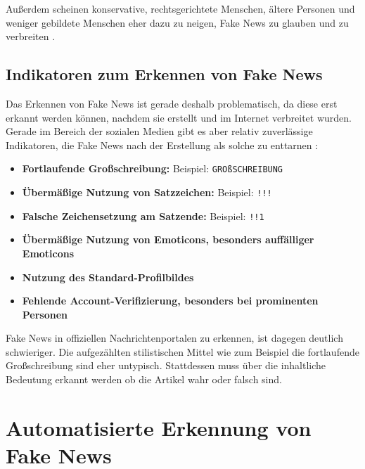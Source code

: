 Außerdem scheinen konservative, rechtsgerichtete Menschen, ältere Personen und weniger gebildete Menschen eher dazu zu neigen, Fake News zu glauben und zu verbreiten \cite{socsci9100185}.

\subsection{Indikatoren zum Erkennen von Fake News}
\label{sec:potenzielle_indikatoren}

Das Erkennen von Fake News ist gerade deshalb problematisch, da diese erst erkannt werden können, nachdem sie erstellt und im Internet verbreitet wurden. \cite{Sharma:2024}
Gerade im Bereich der sozialen Medien gibt es aber relativ zuverlässige Indikatoren, die Fake News nach der Erstellung als solche zu enttarnen \cite{Hartwig2021}:

\begin{itemize}
    \item \textbf{Fortlaufende Großschreibung:} Beispiel: \texttt{GROßSCHREIBUNG}
    
    \item \textbf{Übermäßige Nutzung von Satzzeichen:} Beispiel: \texttt{!!!}
    
    \item \textbf{Falsche Zeichensetzung am Satzende:} Beispiel: \texttt{!!1}
    
    \item \textbf{Übermäßige Nutzung von Emoticons, besonders auffälliger Emoticons}
    
    \item \textbf{Nutzung des Standard-Profilbildes}
    
    \item \textbf{Fehlende Account-Verifizierung, besonders bei prominenten Personen}
\end{itemize}

Fake News in offiziellen Nachrichtenportalen zu erkennen, ist dagegen deutlich schwieriger.
Die aufgezählten stilistischen Mittel wie zum Beispiel die fortlaufende Großschreibung sind eher untypisch.
Stattdessen muss über die inhaltliche Bedeutung erkannt werden ob die Artikel wahr oder falsch sind.


\section{Automatisierte Erkennung von Fake News}
\label{sec:zielsetzung}


